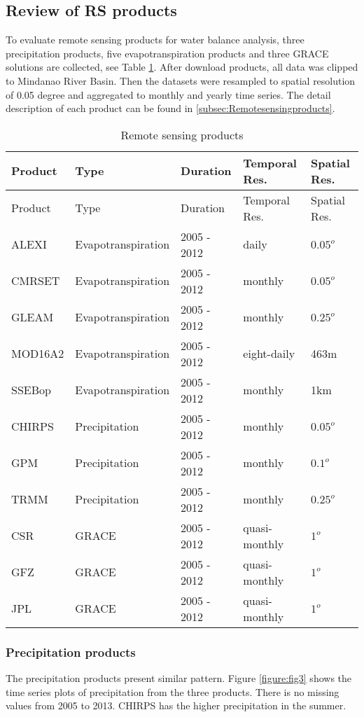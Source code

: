 \documentclass[oneside,openany]{article}%
\begin{document}
\subsection{Review of RS products}%
\label{subsec:ReviewofRSproducts}%
To evaluate remote sensing products for water balance analysis, three precipitation products, five evapotranspiration products and three GRACE solutions are collected, see Table \ref{table:tab1}. After download products, all data was clipped to Mindanao River Basin. Then the datasets were resampled to spatial resolution of 0.05 degree and aggregated to monthly and yearly time series. The detail description of each product can be found in \ref{subsec:Remotesensingproducts}.%
\linebreak%
\begin{longtable}{|l|l|l|l|l|}%
\caption{Remote sensing products}%
\label{table:tab1}\\%
\hline%
\textbf{Product}&\textbf{Type}&\textbf{Duration}&\textbf{Temporal Res.}&\textbf{Spatial Res.}\\%
\hline%
\endfirsthead%
\hline%
Product&Type&Duration&Temporal Res.&Spatial Res.\\%
\hline%
\endhead%
\hline%
\endfoot%
ALEXI&Evapotranspiration&2005 - 2012&daily&$0.05^{o}$\\%
CMRSET&Evapotranspiration&2005 - 2012&monthly&$0.05^{o}$\\%
GLEAM&Evapotranspiration&2005 - 2012&monthly&$0.25^{o}$\\%
MOD16A2&Evapotranspiration&2005 - 2012&eight-daily&463m\\%
SSEBop&Evapotranspiration&2005 - 2012&monthly&1km\\%
CHIRPS&Precipitation&2005 - 2012&monthly&$0.05^{o}$\\%
GPM&Precipitation&2005 - 2012&monthly&$0.1^{o}$\\%
TRMM&Precipitation&2005 - 2012&monthly&$0.25^{o}$\\%
CSR&GRACE&2005 - 2012&quasi-monthly&$1^{o}$\\%
GFZ&GRACE&2005 - 2012&quasi-monthly&$1^{o}$\\%
JPL&GRACE&2005 - 2012&quasi-monthly&$1^{o}$\\%
\end{longtable}%
\subsubsection{Precipitation products}%
\label{ssubsec:Precipitationproducts}%
The precipitation products present similar pattern. Figure \ref{figure:fig3} shows the time series plots of precipitation from the three products. There is no missing values from 2005 to 2013. CHIRPS has the higher precipitation in the summer.%
\linebreak%
\end{document}
